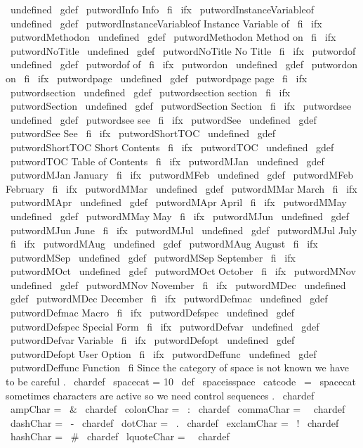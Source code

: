 \
undefined
\
gdef
\
putwordInfo
{
Info
}
\
fi
\
ifx
\
putwordInstanceVariableof
\
undefined
\
gdef
\
putwordInstanceVariableof
{
Instance
Variable
of
}
\
fi
\
ifx
\
putwordMethodon
\
undefined
\
gdef
\
putwordMethodon
{
Method
on
}
\
fi
\
ifx
\
putwordNoTitle
\
undefined
\
gdef
\
putwordNoTitle
{
No
Title
}
\
fi
\
ifx
\
putwordof
\
undefined
\
gdef
\
putwordof
{
of
}
\
fi
\
ifx
\
putwordon
\
undefined
\
gdef
\
putwordon
{
on
}
\
fi
\
ifx
\
putwordpage
\
undefined
\
gdef
\
putwordpage
{
page
}
\
fi
\
ifx
\
putwordsection
\
undefined
\
gdef
\
putwordsection
{
section
}
\
fi
\
ifx
\
putwordSection
\
undefined
\
gdef
\
putwordSection
{
Section
}
\
fi
\
ifx
\
putwordsee
\
undefined
\
gdef
\
putwordsee
{
see
}
\
fi
\
ifx
\
putwordSee
\
undefined
\
gdef
\
putwordSee
{
See
}
\
fi
\
ifx
\
putwordShortTOC
\
undefined
\
gdef
\
putwordShortTOC
{
Short
Contents
}
\
fi
\
ifx
\
putwordTOC
\
undefined
\
gdef
\
putwordTOC
{
Table
of
Contents
}
\
fi
%
\
ifx
\
putwordMJan
\
undefined
\
gdef
\
putwordMJan
{
January
}
\
fi
\
ifx
\
putwordMFeb
\
undefined
\
gdef
\
putwordMFeb
{
February
}
\
fi
\
ifx
\
putwordMMar
\
undefined
\
gdef
\
putwordMMar
{
March
}
\
fi
\
ifx
\
putwordMApr
\
undefined
\
gdef
\
putwordMApr
{
April
}
\
fi
\
ifx
\
putwordMMay
\
undefined
\
gdef
\
putwordMMay
{
May
}
\
fi
\
ifx
\
putwordMJun
\
undefined
\
gdef
\
putwordMJun
{
June
}
\
fi
\
ifx
\
putwordMJul
\
undefined
\
gdef
\
putwordMJul
{
July
}
\
fi
\
ifx
\
putwordMAug
\
undefined
\
gdef
\
putwordMAug
{
August
}
\
fi
\
ifx
\
putwordMSep
\
undefined
\
gdef
\
putwordMSep
{
September
}
\
fi
\
ifx
\
putwordMOct
\
undefined
\
gdef
\
putwordMOct
{
October
}
\
fi
\
ifx
\
putwordMNov
\
undefined
\
gdef
\
putwordMNov
{
November
}
\
fi
\
ifx
\
putwordMDec
\
undefined
\
gdef
\
putwordMDec
{
December
}
\
fi
%
\
ifx
\
putwordDefmac
\
undefined
\
gdef
\
putwordDefmac
{
Macro
}
\
fi
\
ifx
\
putwordDefspec
\
undefined
\
gdef
\
putwordDefspec
{
Special
Form
}
\
fi
\
ifx
\
putwordDefvar
\
undefined
\
gdef
\
putwordDefvar
{
Variable
}
\
fi
\
ifx
\
putwordDefopt
\
undefined
\
gdef
\
putwordDefopt
{
User
Option
}
\
fi
\
ifx
\
putwordDeffunc
\
undefined
\
gdef
\
putwordDeffunc
{
Function
}
\
fi
%
Since
the
category
of
space
is
not
known
we
have
to
be
careful
.
\
chardef
\
spacecat
=
10
\
def
\
spaceisspace
{
\
catcode
\
=
\
spacecat
}
%
sometimes
characters
are
active
so
we
need
control
sequences
.
\
chardef
\
ampChar
=
\
&
\
chardef
\
colonChar
=
\
:
\
chardef
\
commaChar
=
\
\
chardef
\
dashChar
=
\
-
\
chardef
\
dotChar
=
\
.
\
chardef
\
exclamChar
=
\
!
\
chardef
\
hashChar
=
\
#
\
chardef
\
lquoteChar
=
\
\
chardef
\
